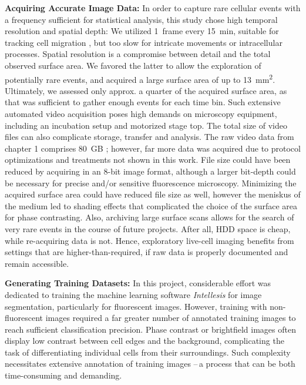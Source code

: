 \textbf{Acquiring Accurate Image Data:}
In order to capture rare cellular events with a frequency sufficient for
statistical analysis, this study chose high temporal resolution and spatial
depth: We utilized \SI{1}{frame} every \SI{15}{\minute}, suitable for tracking
cell migration \cite{huthSignificantlyImprovedPrecision2010}, but too slow for
intricate movements or intracellular processes. Spatial resolution is a
compromise between detail and the total observed surface area. We favored the
latter to allow the exploration of potentially rare events, and acquired a
 large surface area of up to
\SI{13}{\milli\meter\squared}. Ultimately, we assessed only approx. a quarter of
the acquired surface area, as that was sufficient to gather enough events for
each time bin. Such extensive automated video acquisition poses high demands on
microscopy equipment, including an incubation setup and motorized stage top. The
total size of video files can also complicate storage, transfer and analysis.
The raw video data from chapter 1 comprises \SI{80}{GB}
\cite{biostudiesBioStudiesEuropeanBioinformatics}; however, far more data was
acquired due to protocol optimizations and treatments not shown in this work.
File size could have been reduced by acquiring in an 8-bit image format,
although a larger bit-depth could be necessary for precise and/or sensitive
fluorescence microscopy. Minimizing the acquired surface area could have reduced
file size as well, however the meniskus of the medium led to shading
effects that complicated the choice of the surface area for phase contrasting.
Also, archiving large surface scans allows for the search of very rare events in
the course of future projects. After all, HDD space is cheap, while re-acquiring
data is not. Hence, exploratory live-cell imaging benefits from settings that
are higher-than-required, if raw data is properly documented and remain
accessible.



\textbf{Generating Training Datasets:}
In this project, considerable effort was dedicated to training the machine
learning software \textit{Intellesis} for image segmentation, particularly for
fluorescent images. However, training with non-fluorescent images  required a far greater number of annotated training images to
reach sufficient classification precision. Phase contrast or brightfield images
often display low contrast between cell edges and the background, complicating
the task of differentiating individual cells from their surroundings. Such
complexity necessitates extensive annotation of training images --\,a process
that can be both time-consuming and demanding.

